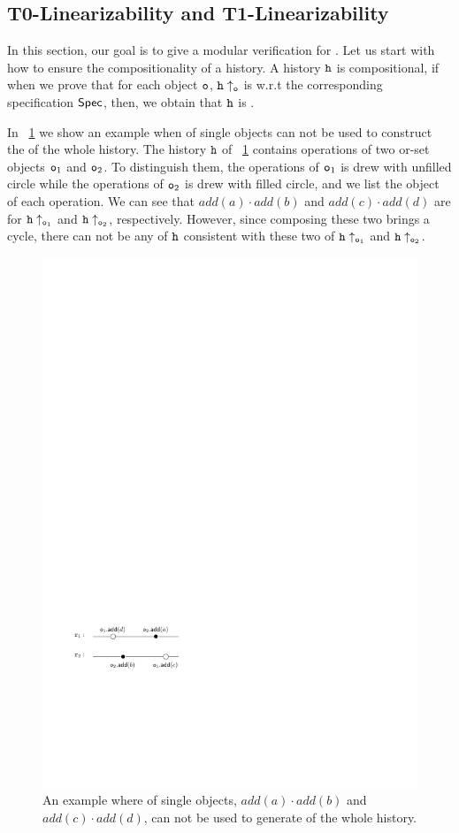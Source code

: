 \subsection{T0-Linearizability and T1-Linearizability}
\label{subsec:t0-linearizability and t1-linearizability}

In this section, our goal is to give a modular verification for \crdtlin. Let us start with how to ensure the compositionality of a history. A history $\mathtt{h}$ is compositional, if when we prove that for each object $\mathtt{o}$, $\mathtt{h} \uparrow_{\mathtt{o}}$ is \crdtlinearizable{} w.r.t the corresponding specification $\mathsf{Spec}$, then, we obtain that $\mathtt{h}$ is \crdtlinearizable{}.


In \figurename~\ref{fig:an example of linearization of single objects do not imply a linearization of the whole history} we show an example when \crdtlinearization{} of single objects can not be used to construct the \crdtlinearization{} of the whole history. The history $\mathtt{h}$ of \figurename~\ref{fig:an example of linearization of single objects do not imply a linearization of the whole history} contains operations of two or-set objects $\mathtt{o}_1$ and $\mathtt{o}_2$. To distinguish them, the operations of $\mathtt{o}_1$ is drew with unfilled circle while the operations of $\mathtt{o}_2$ is drew with filled circle, and we list the object of each operation. We can see that $\mathit{add}(a) \cdot \mathit{add}(b)$ and $\mathit{add}(c) \cdot \mathit{add}(d)$ are \crdtlinearization{} for $\mathtt{h} \uparrow_{\mathtt{o}_1}$ and $\mathtt{h} \uparrow_{\mathtt{o}_2}$, respectively. However, since composing these two \crdtlinearization{} brings a cycle, there can not be any \crdtlinearization{} of $\mathtt{h}$ consistent with these two \crdtlinearization{} of $\mathtt{h} \uparrow_{\mathtt{o}_1}$ and $\mathtt{h} \uparrow_{\mathtt{o}_2}$.

\begin{figure}[t]
  \centering
  \includegraphics[width=0.35 \textwidth]{figures/TwoSubLin-NotaGlobalLin.pdf}
\vspace{-10pt}
  \caption{An example where \crdtlinearization{} of single objects, $\mathit{add}(a) \cdot \mathit{add}(b)$ and $\mathit{add}(c) \cdot \mathit{add}(d)$, can not be used to generate \crdtlinearization{} of the whole history.}
  \label{fig:an example of linearization of single objects do not imply a linearization of the whole history}
\end{figure}

